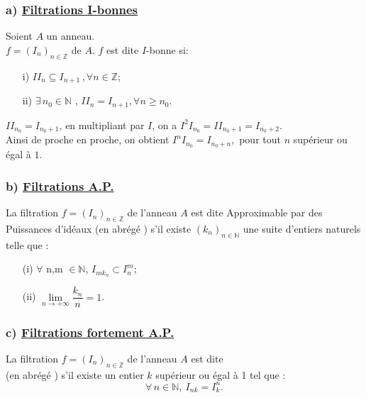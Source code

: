 \subsubsection{a) \underline{Filtrations I-bonnes}} 
\begin{madefinition}
	Soient $A$ un anneau.\\
	$f = (I_n)_{n \in \mathbb{Z}}$ de $A$. $f$ est dite $I$-bonne si:
	\begin{enumerate}
		\item[i)]$ II_n \subseteq I_{n+1} \, ,\forall n \in \mathbb{Z}$;
		\item[ii)]$\exists  \, n_0 \in \mathbb{N}$ , $II_n = I_{n+1}, \forall n \geqslant n_0.$
	\end{enumerate}
\end{madefinition}
\begin{maconsequence}
	$II_{n_0} = I_{n_{0}+1}$, en multipliant par $I$, on a $I^{2}I_{n_0} = II_{n_{0}+1}= I_{n_{0}+2}$. \\
	Ainsi de proche en proche, on obtient $I^{n}I_{n_0} = I_{n_{0}+n},$ pour tout $n$ supérieur ou égal à $1$. 
\end{maconsequence}
\subsubsection{b) \underline{Filtrations A.P.}}
\begin{madefinition}
	La filtration $f = (I_n)_{n \in \mathbb{Z}}$ de l'anneau $A$ est dite Approximable par des Puissances d'idéaux (en abrégé ) s'il existe $(k_{n})_{n \in \mathbb{N}}$ une suite d'entiers naturels telle que :
	\begin{enumerate}
		\item[(i)] $\forall$ n,m $\in \mathbb{N}$, $I_{mk_n} \subset I_n^{m}$;
		\item[(ii)] $\underset{n\longrightarrow +\infty }{\lim }\dfrac{k_{n}}{n}=1$.
	\end{enumerate}
\end{madefinition}
\subsubsection{c) \underline{Filtrations fortement A.P.}}
\begin{madefinition}
	La filtration $f = (I_n)_{n \in \mathbb{Z}}$ de l'anneau $A$ est dite \\  (en abrégé ) s'il existe un entier $k $ supérieur ou égal à 1 tel que :
	\[ \forall \, n \in \mathbb{N}, \ I_{nk} = I_k^n. \]
\end{madefinition}
